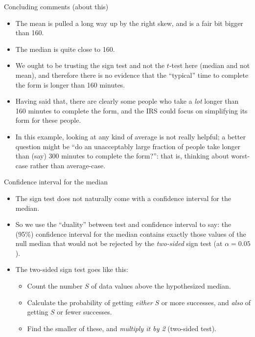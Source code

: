 \documentclass[unknownkeysallowed]{beamer}\usepackage[]{graphicx}\usepackage[]{color}
\begin{document}
\begin{frame}[fragile]{Concluding comments (about this)}
  
  \begin{itemize}
  \item The mean is pulled a long way up by the right skew, and is a
    fair bit bigger than 160.
  \item The median is quite close to 160.
  \item We ought to be trusting the sign test and not the $t$-test
    here (median and not mean), and therefore there is no evidence
    that the ``typical'' time to complete the form is longer than 160
    minutes. 
  \item Having said that, there are clearly some people who take a
    \emph{lot} longer than 160 minutes to complete the form, and the
    IRS could focus on simplifying its form for these people.
  \item In this example, looking at any kind of average is not really
    helpful; a better question might be ``do an unacceptably large
    fraction of people take longer than (say) 300 minutes to complete
    the form?'': that is, thinking about worst-case rather than
    average-case.
  \end{itemize}
  
\end{frame}

\begin{frame}[fragile]{Confidence interval for the median}
  
  \begin{itemize}
  \item The sign test does not naturally come with a confidence
    interval for the median.
  \item So we use the ``duality'' between test and confidence interval
    to say: the (95\%) confidence interval for the median contains
    exactly those values of the null median that would not be rejected
    by the \emph{two-sided} sign test (at $\alpha=0.05$).
  \item The two-sided sign test goes like this:
    
    \begin{itemize}
    \item Count the number $S$ of data values above the
      hypothesized median.
    \item Calculate the probability of getting \emph{either} $S$ or
      more successes, and \emph{also} of getting $S$ or fewer
      successes.
    \item Find the smaller of these, and \emph{multiply it by 2}
      (two-sided test).
    \end{itemize}
  \end{itemize}
  
\end{frame}
\end{document}
